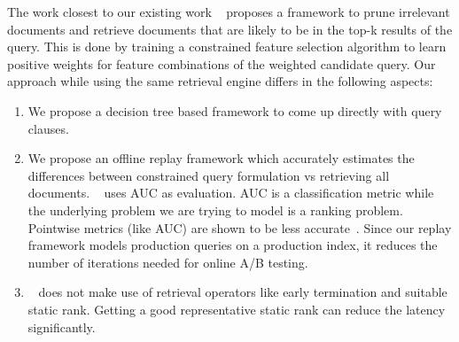 The work closest to our existing work ~\cite{borisyuk2016casmos} proposes a
framework to prune irrelevant documents and retrieve documents that are likely
to be in the top-k results of the query. This is done by training a constrained
feature selection algorithm to learn positive weights for feature combinations
of the weighted candidate query. Our approach while using the same retrieval
engine differs in the following aspects:
\begin{enumerate}
        \item We propose a decision tree based framework to come up directly
            with query clauses. 
        \item We propose an offline replay framework which accurately estimates
            the differences between constrained query formulation vs retrieving
            all documents. ~\cite{borisyuk2016casmos} uses AUC as evaluation.
            AUC is a classification metric while the underlying problem we are
            trying to model is a ranking problem. Pointwise metrics (like AUC)
            are shown to be less accurate~\cite{xia2008listwise,
            liu2009learning}. Since our replay framework models production
            queries on a production index, it reduces the number of iterations
            needed for online A/B testing.
        \item ~\cite{borisyuk2016casmos} does not make use of retrieval
            operators like early termination and suitable static rank. Getting
            a good representative static rank can reduce the latency
            significantly.
\end{enumerate}
